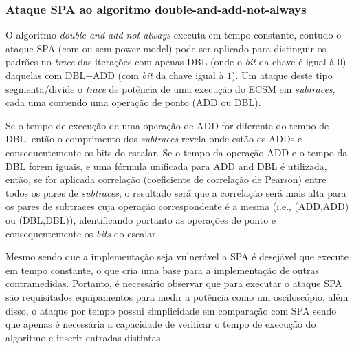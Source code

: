 \subsubsection{Ataque SPA ao algoritmo double-and-add-not-always}
O algoritmo \textit{double-and-add-not-always} executa em tempo constante, contudo o ataque SPA (com ou sem power model) pode ser aplicado para distinguir os padrões no \textit{trace} das iterações com apenas DBL (onde o \textit{bit} da chave é igual à $0$) daquelas com DBL+ADD (com \textit{bit} da chave igual à $1$). Um ataque deste tipo segmenta/divide o \textit{trace} de potência de uma execução do ECSM em \textit{subtraces}, cada uma contendo uma operação de ponto (ADD ou DBL). 

Se o tempo de execução de uma operação de ADD for diferente do tempo de DBL, então o comprimento dos \textit{subtraces} revela onde estão os ADDs e consequentemente os bits do escalar. Se o tempo da operação ADD e o tempo da DBL forem iguais, e uma fórmula unificada para ADD and DBL é utilizada, então, se for aplicada correlação (coeficiente de correlação de Pearson) entre todos os pares de \textit{subtraces}, o resultado será que a correlação será mais alta para os pares de subtraces cuja operação correspondente é a mesma (i.e., (ADD,ADD) ou (DBL,DBL)), identificando portanto as operações de ponto e consequentemente os \textit{bits} do escalar.

Mesmo sendo que a implementação seja vulnerável a SPA é desejável que execute em tempo constante, o que cria uma base para a implementação de outras contramedidas. Portanto, é necessário observar que para executar o ataque SPA são requisitados equipamentos para medir a potência como um osciloscópio, além disso, o ataque por tempo possui simplicidade em comparação com SPA sendo que apenas é necessária a capacidade de verificar o tempo de execução do algoritmo e inserir entradas distintas.

